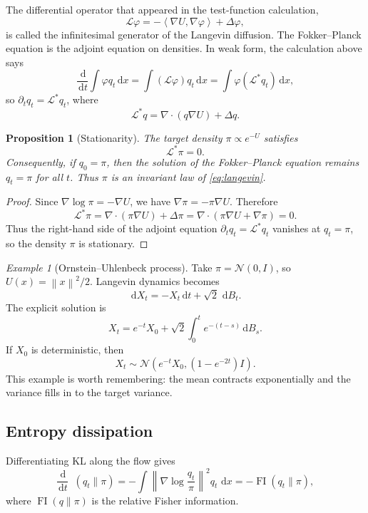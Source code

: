 \documentclass{amsart}
\numberwithin{equation}{section}
\theoremstyle{plain}
\newtheorem{prop}[theorem]{Proposition}
\theoremstyle{definition}
\theoremstyle{remark}
\newtheorem*{example}{Example}
\DeclareMathOperator{\KL}{D_{\mathsf{KL}}}
\DeclareMathOperator{\FI}{FI}
\newcommand{\dd}{\,\mathrm{d}}
\newcommand{\Id}{I}
\newcommand{\norm}[1]{\left\lVert #1 \right\rVert}
\newcommand{\ip}[2]{\left\langle #1,#2 \right\rangle}
\newcommand{\normal}[2]{\mathcal{N}\!\left(#1,#2\right)}
\begin{document}
The differential operator that appeared in the test-function calculation,
\[
    \mathcal L\varphi
    =
    -\ip{\nabla U}{\nabla\varphi}+\Delta\varphi,
\]
is called the infinitesimal generator of the Langevin diffusion.  The
Fokker--Planck equation is the adjoint equation on densities.  In weak form,
the calculation above says
\[
    \frac{\dd}{\dd t}\int \varphi q_t\dd x
    =
    \int (\mathcal L\varphi) q_t\dd x
    =
    \int \varphi(\mathcal L^\ast q_t)\dd x,
\]
so $\partial_t q_t=\mathcal L^\ast q_t$, where
\[
    \mathcal L^\ast q
    =
    \nabla\cdot(q\nabla U)+\Delta q.
\]

\begin{prop}[Stationarity]
The target density $\pi\propto e^{-U}$ satisfies
\[
    \mathcal L^\ast \pi=0.
\]
Consequently, if $q_0=\pi$, then the solution of the Fokker--Planck equation
remains $q_t=\pi$ for all $t$.  Thus $\pi$ is an invariant law of
\eqref{eq:langevin}.
\end{prop}

\begin{proof}
Since $\nabla\log\pi=-\nabla U$, we have $\nabla\pi=-\pi\nabla U$.  Therefore
\[
    \mathcal L^\ast\pi
    =
    \nabla\cdot(\pi\nabla U)+\Delta\pi
    =
    \nabla\cdot(\pi\nabla U+\nabla\pi)
    =
    0.
\]
Thus the right-hand side of the adjoint equation
$\partial_t q_t=\mathcal L^\ast q_t$ vanishes at $q_t=\pi$, so the density
$\pi$ is stationary.
\end{proof}

\begin{example}[Ornstein--Uhlenbeck process]
Take $\pi=\normal{0}{\Id}$, so $U(x)=\norm{x}^2/2$.  Langevin dynamics becomes
\[
    \dd X_t=-X_t\dd t+\sqrt2\,\dd B_t.
\]
The explicit solution is
\[
    X_t=e^{-t}X_0+\sqrt2\int_0^t e^{-(t-s)}\dd B_s.
\]
If $X_0$ is deterministic, then
\[
    X_t\sim\normal{e^{-t}X_0}{(1-e^{-2t})\Id}.
\]
This example is worth remembering: the mean contracts exponentially and the
variance fills in to the target variance.
\end{example}

\subsection{Entropy dissipation}

Differentiating KL along the flow gives
\begin{equation}\label{eq:entropy-dissipation}
    \frac{\dd}{\dd t}\KL(q_t\|\pi)
    =
    -\int \norm{\nabla\log\frac{q_t}{\pi}}^2 q_t\,\dd x
    =-\FI(q_t\|\pi),
\end{equation}
where $\FI(q\|\pi)$ is the relative Fisher information.
\end{document}
